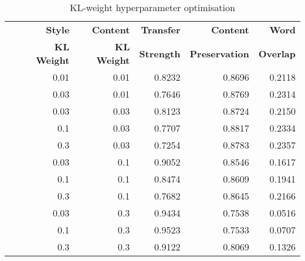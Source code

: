 \begin{table}[ht]
	\centering
	\begin{tabular}{| c | r | r | r | r | r |}
		\hline
		\multirow{2}{*}{
		} & \textbf{Style}     & \textbf{Content}   & \textbf{Transfer} & \textbf{Content}      & \textbf{Word}    \\
		  & \textbf{KL Weight} & \textbf{KL Weight} & \textbf{Strength} & \textbf{Preservation} & \textbf{Overlap} \\
		\hline
		\hline
		  & 0.01               & 0.01               & 0.8232            & 0.8696                & 0.2118           \\
		\hline
		  & 0.03               & 0.01               & 0.7646            & 0.8769                & 0.2314           \\
		\hline
		  & 0.03               & 0.03               & 0.8123            & 0.8724                & 0.2150           \\
		\hline
		  & 0.1                & 0.03               & 0.7707            & 0.8817                & 0.2334           \\
		\hline
		  & 0.3                & 0.03               & 0.7254            & 0.8783                & 0.2357           \\
		\hline
		  & 0.03               & 0.1                & 0.9052            & 0.8546                & 0.1617           \\
		\hline
		  & 0.1                & 0.1                & 0.8474            & 0.8609                & 0.1941           \\
		\hline
		  & 0.3                & 0.1                & 0.7682            & 0.8645                & 0.2166           \\
		\hline
		  & 0.03               & 0.3                & 0.9434            & 0.7538                & 0.0516           \\
		\hline
		  & 0.1                & 0.3                & 0.9523            & 0.7533                & 0.0707           \\
		\hline
		  & 0.3                & 0.3                & 0.9122            & 0.8069                & 0.1326           \\
		\hline
	\end{tabular}
	\caption{KL-weight hyperparameter optimisation}
	\label{tab:kl-hyperparam-opt}
\end{table}

